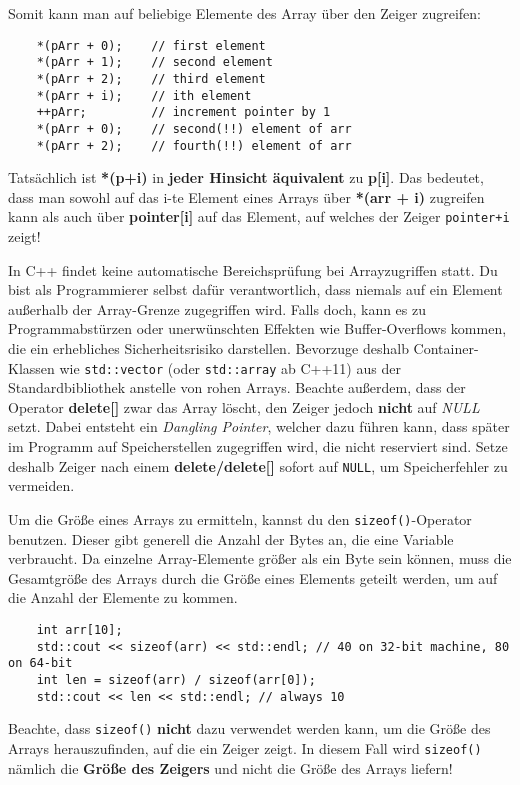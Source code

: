 Somit kann man auf beliebige Elemente des Array über den Zeiger zugreifen:

\begin{lstlisting}
	*(pArr + 0);	// first element
	*(pArr + 1);	// second element
	*(pArr + 2);	// third element
	*(pArr + i);	// ith element
	++pArr;			// increment pointer by 1
	*(pArr + 0);	// second(!!) element of arr
	*(pArr + 2);	// fourth(!!) element of arr
\end{lstlisting}

Tatsächlich ist \textbf{*(p+i)} in \textbf{jeder Hinsicht äquivalent} zu \textbf{p[i]}.
Das bedeutet, dass man sowohl auf das i-te Element eines Arrays über \textbf{*(arr + i)} zugreifen kann als auch über \textbf{pointer[i]} auf das Element, auf welches der Zeiger \texttt{pointer+i} zeigt!

In C++ findet keine automatische Bereichsprüfung bei Arrayzugriffen statt.
Du bist als Programmierer selbst dafür verantwortlich, dass niemals auf ein Element außerhalb der Array-Grenze zugegriffen wird.
Falls doch, kann es zu Programmabstürzen oder unerwünschten Effekten wie  Buffer-Overflows kommen, die ein erhebliches Sicherheitsrisiko darstellen.
Bevorzuge deshalb Container-Klassen wie \texttt{std::vector} (oder \texttt{std::array} ab C++11) aus der Standardbibliothek anstelle von \glqq rohen\grqq{} Arrays.
Beachte außerdem, dass der Operator \textbf{delete[]} zwar das Array löscht, den Zeiger jedoch \textbf{nicht} auf \emph{NULL} setzt.
Dabei entsteht ein \emph{Dangling Pointer}, welcher dazu führen kann, dass später im Programm auf Speicherstellen zugegriffen wird, die nicht reserviert sind.
Setze deshalb Zeiger nach einem \textbf{delete/delete[]} sofort auf \texttt{NULL}, um Speicherfehler zu vermeiden.

Um die Größe eines Arrays zu ermitteln, kannst du den \texttt{sizeof()}-Operator benutzen. Dieser gibt generell die Anzahl der Bytes an, die eine Variable verbraucht. Da einzelne Array-Elemente größer als ein Byte sein können, muss die Gesamtgröße des Arrays durch die Größe eines Elements geteilt werden, um auf die Anzahl der Elemente zu kommen.

\begin{lstlisting}
	int arr[10];
	std::cout << sizeof(arr) << std::endl; // 40 on 32-bit machine, 80 on 64-bit
	int len = sizeof(arr) / sizeof(arr[0]);
	std::cout << len << std::endl; // always 10
\end{lstlisting}

Beachte, dass \texttt{sizeof()} \textbf{nicht} dazu verwendet werden kann, um die Größe des Arrays herauszufinden, auf die ein Zeiger zeigt.
In diesem Fall wird \texttt{sizeof()} nämlich die \textbf{Größe des Zeigers} und nicht die Größe des Arrays liefern!

